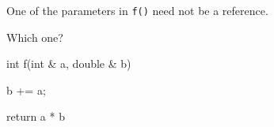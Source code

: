 One of the parameters in \texttt{f()} need not be a reference.



Which one?



\begin{consolethree}[escapeinside=||]

int f(int & a, double & b)

{

    b += a;

    return a * b

}

\end{consolethree}

